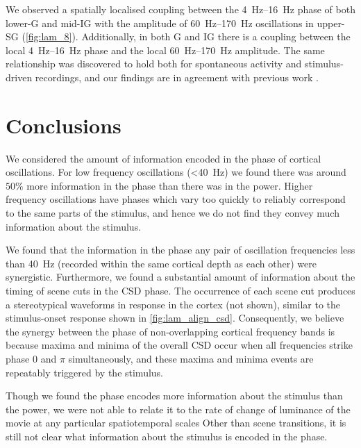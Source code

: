 We observed a spatially localised coupling between the \SIrange{4}{16}{Hz} phase of both lower-\ac{G} and mid-\ac{IG} with the amplitude of \SIrange{60}{170}{Hz} oscillations in upper-\ac{SG} (\autoref{fig:lam_8}).
Additionally, in both \ac{G} and \ac{IG} there is a coupling between the local \SIrange{4}{16}{Hz} phase and the local \SIrange{60}{170}{Hz} amplitude.
The same relationship was discovered to hold both for spontaneous activity and stimulus-driven recordings, and our findings are in agreement with previous work \citep{Spaak2012}.


\section{Conclusions}

We considered the amount of information encoded in the phase of cortical oscillations.
For low frequency oscillations (\SI{<40}{Hz}) we found there was around $50\%$ more information in the phase than there was in the power.
Higher frequency oscillations have phases which vary too quickly to reliably correspond to the same parts of the stimulus, and hence we do not find they convey much information about the stimulus.

We found that the information in the phase any pair of oscillation frequencies less than \SI{40}{Hz} (recorded within the same cortical depth as each other) were synergistic.
Furthermore, we found a substantial amount of information about the timing of scene cuts in the \ac{CSD} phase.
The occurrence of each scene cut produces a stereotypical waveforms in response in the cortex (not shown), similar to the stimulus-onset response shown in \autoref{fig:lam_align_csd}.
Consequently, we believe the synergy between the phase of non-overlapping cortical frequency bands is because maxima and minima of the overall \ac{CSD} occur when all frequencies strike phase $0$ and $\pi$ simultaneously, and these maxima and minima events are repeatably triggered by the stimulus.

Though we found the phase encodes more information about the stimulus than the power, we were not able to relate it to the rate of change of luminance of the movie at any particular spatiotemporal scales
Other than scene transitions, it is still not clear what information about the stimulus is encoded in the phase.

